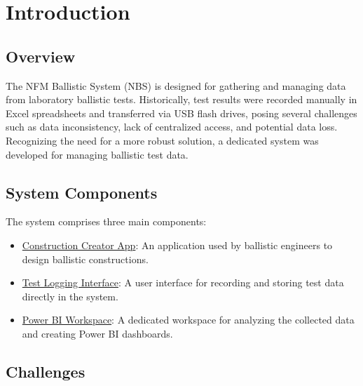 \section{Introduction}

\subsection{Overview}

The NFM Ballistic System (NBS) is designed for gathering and managing data from laboratory ballistic tests. Historically, test results were recorded manually in Excel spreadsheets and transferred via USB flash drives, posing several challenges such as data inconsistency, lack of centralized access, and potential data loss. Recognizing the need for a more robust solution, a dedicated system was developed for managing ballistic test data.

\subsection{System Components}

The system comprises three main components:
\begin{itemize}
	\item \href{https://orga9b1f99a.crm4.dynamics.com/main.aspx?appid=05ee93e5-63be-e911-a95f-000d3ab5e874&pagetype=entitylist&etn=craab_nbsgrouporder&viewid=2e17b148-b9c6-4803-9c9e-780fa5c0f116&viewType=1039}{Construction Creator App}: An application used by ballistic engineers to design ballistic constructions.
	\item \href{https://apps.powerapps.com/play/e/default-6013a954-a3ca-49c2-b3e2-288264752369/a/e1db19c6-4475-4b66-be3b-fcec7d220129?tenantId=6013a954-a3ca-49c2-b3e2-288264752369}{Test Logging Interface}: A user interface for recording and storing test data directly in the system.
	\item \href{https://app.powerbi.com/groups/acc871ab-9fcc-4ad0-ae62-d5a01f6be861/reports/107f9975-1c49-435a-96cd-3f074ccbc45f/ReportSection0d700cbb5dfcceb8b5e5?ctid=6013a954-a3ca-49c2-b3e2-288264752369&experience=power-bi}{Power BI Workspace}: A dedicated workspace for analyzing the collected data and creating Power BI dashboards.
\end{itemize}

\newpage

\subsection{Challenges}

